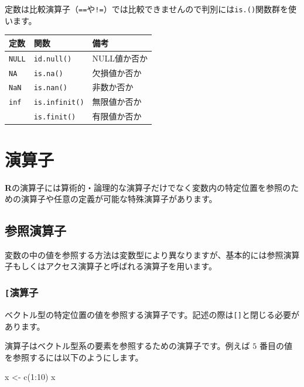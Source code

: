 \documentclass[
  12pt,
]{book}
\newenvironment{Shaded}{\begin{snugshade}}{\end{snugshade}}
\newcommand{\DecValTok}[1]{\textcolor[rgb]{0.00,0.00,0.81}{#1}}
\newcommand{\FunctionTok}[1]{\textcolor[rgb]{0.00,0.00,0.00}{#1}}
\newcommand{\NormalTok}[1]{#1}
\newcommand{\OtherTok}[1]{\textcolor[rgb]{0.56,0.35,0.01}{#1}}
\newcommand{\SpecialCharTok}[1]{\textcolor[rgb]{0.00,0.00,0.00}{#1}}
\begin{document}
定数は比較演算子（\texttt{==}や\texttt{!=}）では比較できませんので判別には\texttt{is.()}関数群を使います。

\begin{longtable}[]{@{}lll@{}}
\toprule
定数 & 関数 & 備考 \\
\midrule
\endhead
\texttt{NULL} & \texttt{id.null()} & NULL値か否か \\
\texttt{NA} & \texttt{is.na()} & 欠損値か否か \\
\texttt{NaN} & \texttt{is.nan()} & 非数か否か \\
\texttt{inf} & \texttt{is.infinit()} & 無限値か否か \\
　 & \texttt{is.finit()} & 有限値か否か \\
\bottomrule
\end{longtable}

\hypertarget{ux6f14ux7b97ux5b50}{%
\section{演算子}\label{ux6f14ux7b97ux5b50}}

\textbf{R}の演算子には算術的・論理的な演算子だけでなく変数内の特定位置を参照のための演算子や任意の定義が可能な特殊演算子があります。

\hypertarget{ux53c2ux7167ux6f14ux7b97ux5b50}{%
\subsection{参照演算子}\label{ux53c2ux7167ux6f14ux7b97ux5b50}}

変数の中の値を参照する方法は変数型により異なりますが、基本的には参照演算子もしくはアクセス演算子と呼ばれる演算子を用います。

\hypertarget{ux6f14ux7b97ux5b50-1}{%
\subsubsection{\texorpdfstring{\texttt{{[}}演算子}{{[}演算子}}\label{ux6f14ux7b97ux5b50-1}}

ベクトル型の特定位置の値を参照する演算子です。記述の際は\texttt{{[}{]}}と閉じる必要があります。

演算子はベクトル型系の要素を参照するための演算子です。例えば \(5\) 番目の値を参照するには以下のようにします。

\begin{Shaded}
\begin{Highlighting}[]
\NormalTok{x }\OtherTok{\textless{}{-}} \FunctionTok{c}\NormalTok{(}\DecValTok{1}\SpecialCharTok{:}\DecValTok{10}\NormalTok{)}
\NormalTok{x}
\end{Highlighting}
\end{Shaded}
\end{document}
